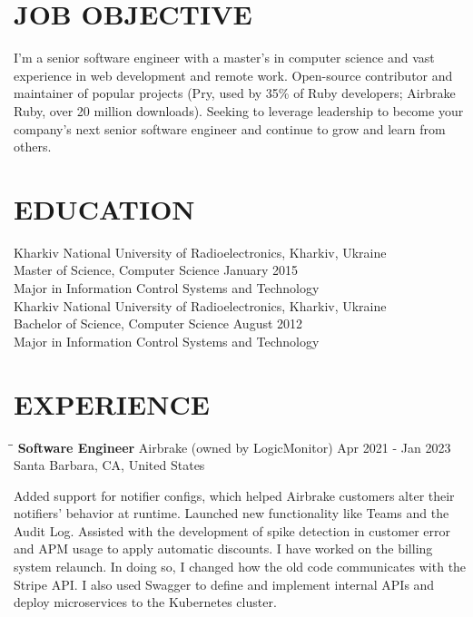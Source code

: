 \documentclass{res}
\begin{document}
\address{Kharkiv, Ukraine\\silin@kyrylo.org\\+380 98 909-30-34}

\begin{resume}

  \section{JOB OBJECTIVE}
  I'm a senior software engineer with a master’s in computer science and vast
  experience in web development and remote work. Open-source contributor and
  maintainer of popular projects (Pry, used by 35\% of Ruby developers; Airbrake
  Ruby, over 20 million downloads). Seeking to leverage leadership to become
  your company’s next senior software engineer and continue to grow and learn
  from others.

  \section{EDUCATION}
  Kharkiv National University of Radioelectronics, Kharkiv, Ukraine \\
  Master of Science, Computer Science \hfill January 2015 \\
  Major in Information Control Systems and Technology \\

  Kharkiv National University of Radioelectronics, Kharkiv, Ukraine \\
  Bachelor of Science, Computer Science \hfill August 2012 \\
  Major in Information Control Systems and Technology \\

  \section{EXPERIENCE}
  \vspace{-0.1in}

  \begin{tabbing}
    \hspace{2.3in}\= \hspace{2.6in}\= \kill
    {\bf Software Engineer}  \>Airbrake (owned by LogicMonitor) \>
    \hspace{-0.2in} Apr 2021 - Jan 2023\\
    \>Santa Barbara, CA, United States
  \end{tabbing}\vspace{-20pt}
  Added support for notifier configs, which helped Airbrake customers alter
  their notifiers' behavior at runtime. Launched new functionality like Teams
  and the Audit Log. Assisted with the development of spike detection in
  customer error and APM usage to apply automatic discounts. I have worked on
  the billing system relaunch. In doing so, I changed how the old code
  communicates with the Stripe API. I also used Swagger to define and implement
  internal APIs and deploy microservices to the Kubernetes cluster.


\end{resume}
\end{document}
